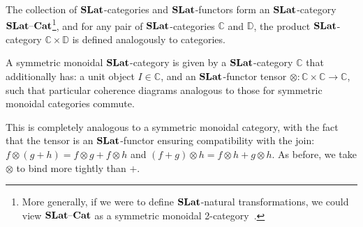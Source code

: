 The collection of $\mathbf{SLat}$-categories and $\mathbf{SLat}$-functors form an $\mathbf{SLat}$-category $\mathbf{SLat}\text{--}\mathbf{Cat}$\footnote{More generally, if we were to define $\mathbf{SLat}$-natural transformations, we could view $\mathbf{SLat}\text{--}\mathbf{Cat}$ as a symmetric monoidal 2-category~\cite{Kelly2022BASICCO}.}, and for any pair of $\mathbf{SLat}$-categories $\mathbb{C}$ and $\mathbb{D}$, the product $\mathbf{SLat}$-category $\mathbb{C} \times \mathbb{D}$ is defined analogously to categories.

\begin{defi}%
	\label{def:enriched-prop}
	A symmetric monoidal $\mathbf{SLat}$-category is given by a $\mathbf{SLat}$-category $\mathbb{C}$ that additionally has: a unit object $I \in \mathbb{C}$, and an $\mathbf{SLat}$-functor tensor $\otimes\colon \mathbb{C} \times \mathbb{C} \to \mathbb{C}$, such that particular coherence diagrams analogous to those for symmetric monoidal categories commute.
\end{defi}
This is completely analogous to a symmetric monoidal category, with the fact that the tensor is an $\mathbf{SLat}$-functor ensuring compatibility with the join: $f \otimes (g+h) = f \otimes g + f \otimes h $ and $ (f+g) \otimes h = f \otimes h + g \otimes h$.
As before, we take $\otimes$ to bind more tightly than $+$.

